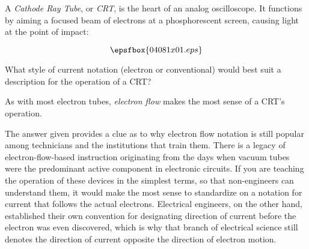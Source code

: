 

A {\it Cathode Ray Tube}, or {\it CRT}, is the heart of an analog oscilloscope.  It functions by aiming a focused beam of electrons at a phosphorescent screen, causing light at the point of impact:

$$\epsfbox{04081x01.eps}$$

What style of current notation (electron or conventional) would best suit a description for the operation of a CRT?







As with most electron tubes, {\it electron flow} makes the most sense of a CRT's operation.







The answer given provides a clue as to why electron flow notation is still popular among technicians and the institutions that train them.  There is a legacy of electron-flow-based instruction originating from the days when vacuum tubes were the predominant active component in electronic circuits.  If you are teaching the operation of these devices in the simplest terms, so that non-engineers can understand them, it would make the most sense to standardize on a notation for current that follows the actual electrons.  Electrical engineers, on the other hand, established their own convention for designating direction of current before the electron was even discovered, which is why that branch of electrical science still denotes the direction of current opposite the direction of electron motion.




